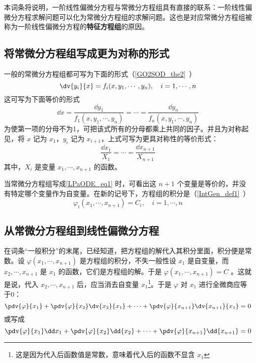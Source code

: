 本词条将说明，一阶线性偏微分方程与常微分方程组具有直接的联系：一阶线性偏微分方程求解问题可以化为常微分方程组的求解问题。这也是对应常微分方程组被称为一阶线性偏微分方程的\textbf{特征方程组}的原因。
\subsection{将常微分方程组写成更为对称的形式}
一般的常微分方程组都可写为下面的形式（\autoref{GO2SOD_the2}~）
\begin{equation}\label{LPaODE_eq4}
\dv{y_i}{x}=f_i(x,y_1,\cdots,y_n),\quad i=1,\cdots,n
\end{equation}
这可写为下面等价的形式
\begin{equation}
\dd x=\frac{\dd y_1}{f_1(x,y_1,\cdots,y_n)}=\cdots=\frac{\dd y_n}{f_n(x,y_1,\cdots,y_n)}
\end{equation}
为使第一项的分母不为1，可把该式所有的分母都乘上共同的因子。并且为对称起见，将 $x$ 记为 $x_1$，$y_i$ 记为 $x_{i+1}$，上式可写为更具对称性的等价形式：
\begin{equation}\label{LPaODE_eq1}
\frac{\dd x_1}{X_1}=\cdots=\frac{\dd x_{n+1}}{X_{n+1}}
\end{equation}
其中，$X_i$ 是变量 $x_1,\cdots,x_{n+1}$ 的函数。

当常微分方程组写成\autoref{LPaODE_eq1} 时，可看出这 $n+1$ 个变量是等价的，并没有特定哪个变量作为自变量。在新的记号下，方程组的积分是（\autoref{IntGen_def1}~）
\begin{equation}
\varphi_i(x_1,\cdots,x_{n+1})=C_i,\quad i=1,\cdots,n
\end{equation}
\subsection{从常微分方程组到线性偏微分方程}
在词条“一般积分”的末尾，已经知道，把方程组的解代入其积分里面，积分便是常数。设 $\varphi(x_1,\cdots,x_{n+1})$ 是方程组的积分，不失一般性设 $x_1$ 是自变量，而 $x_2,\cdots,x_{n+1}$ 是 $x_1$ 的函数，它们是方程组的解。于是 $\varphi(x_1,\cdots,x_{n+1})=C$ 。这就是说，代入 $x_2,\cdots,x_{n+1}$ 后，应当消去自变量 $x_1$\footnote{这是因为代入后函数值是常数，意味着代入后的函数不显含 $x_1$}。于是 $\varphi$ 对 $x_1$ 进行全微商应等于0：
\begin{equation}
\pdv{\varphi}{x_1}+\pdv{\varphi}{x_2}\dv{x_2}{x_1}+\cdots+\pdv{\varphi}{x_{n+1}}\dv{x_{n+1}}{x_1}=0
\end{equation}
或写成
\begin{equation}\label{LPaODE_eq2}
\pdv{\varphi}{x_1}\dd x_1+\pdv{\varphi}{x_2}\dd{x_2}+\cdots+\pdv{\varphi}{x_{n+1}}\dd{x_{n+1}}=0
\end{equation}

